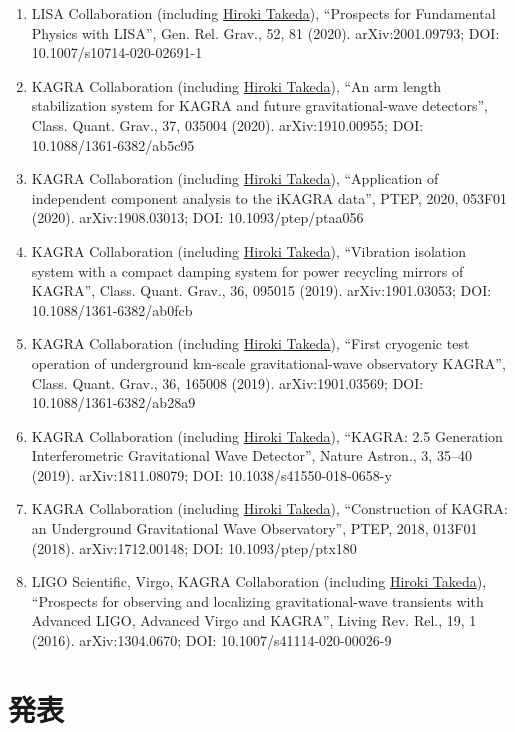 \documentclass[uplatex, 11pt]{jsarticle}
\begin{document}
\begin{enumerate}
\item LISA Collaboration (including \uline{Hiroki Takeda}), “Prospects for Fundamental Physics with LISA”, Gen. Rel. Grav., 52, 81 (2020). arXiv:2001.09793; DOI: 10.1007/s10714-020-02691-1
\item KAGRA Collaboration (including \uline{Hiroki Takeda}), “An arm length stabilization system for KAGRA and future gravitational-wave detectors”, Class. Quant. Grav., 37, 035004 (2020). arXiv:1910.00955; DOI: 10.1088/1361-6382/ab5c95
\item KAGRA Collaboration (including \uline{Hiroki Takeda}), “Application of independent component analysis to the iKAGRA data”, PTEP, 2020, 053F01 (2020). arXiv:1908.03013; DOI: 10.1093/ptep/ptaa056
\item KAGRA Collaboration (including \uline{Hiroki Takeda}), “Vibration isolation system with a compact damping system for power recycling mirrors of KAGRA”, Class. Quant. Grav., 36, 095015 (2019). arXiv:1901.03053; DOI: 10.1088/1361-6382/ab0fcb
\item KAGRA Collaboration (including \uline{Hiroki Takeda}), “First cryogenic test operation of underground km-scale gravitational-wave observatory KAGRA”, Class. Quant. Grav., 36, 165008 (2019). arXiv:1901.03569; DOI: 10.1088/1361-6382/ab28a9
\item KAGRA Collaboration (including \uline{Hiroki Takeda}), “KAGRA: 2.5 Generation Interferometric Gravitational Wave Detector”, Nature Astron., 3, 35--40 (2019). arXiv:1811.08079; DOI: 10.1038/s41550-018-0658-y
\item KAGRA Collaboration (including \uline{Hiroki Takeda}), “Construction of KAGRA: an Underground Gravitational Wave Observatory”, PTEP, 2018, 013F01 (2018). arXiv:1712.00148; DOI: 10.1093/ptep/ptx180
\item LIGO Scientific, Virgo, KAGRA Collaboration (including \uline{Hiroki Takeda}), “Prospects for observing and localizing gravitational-wave transients with Advanced LIGO, Advanced Virgo and KAGRA”, Living Rev. Rel., 19, 1 (2016). arXiv:1304.0670; DOI: 10.1007/s41114-020-00026-9
\end{enumerate}


\section*{発表}
\end{document}
